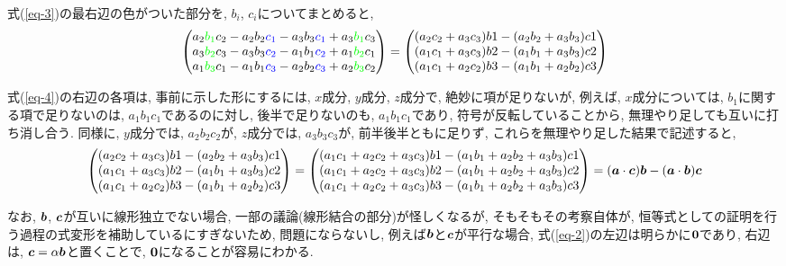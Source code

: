 \documentclass{jsarticle}
\newcommand*{\mbold}[1]{\mbox{\boldmath $#1$}}
\begin{document}
式(\ref{eq-3})の最右辺の色がついた部分を, $b_i$, $c_i$についてまとめると, 
\begin{equation}\label{eq-4}
  \begin{pmatrix}
      a_2 \textcolor{green}{b_1} c_2 - a_2 b_2 \textcolor{blue}{c_1} - a_3 b_3 \textcolor{blue}{c_1} + a_3 \textcolor{green}{b_1} c_3 \\
      a_3 \textcolor{green}{b_2} c_3 - a_3 b_3 \textcolor{blue}{c_2} - a_1 b_1 \textcolor{blue}{c_2} + a_1 \textcolor{green}{b_2} c_1 \\
      a_1 \textcolor{green}{b_3} c_1 - a_1 b_1 \textcolor{blue}{c_3} - a_2 b_2 \textcolor{blue}{c_3} + a_2 \textcolor{green}{b_3} c_2
  \end{pmatrix}
  = \begin{pmatrix}
      (a_2 c_2 + a_3 c_3)b1 - (a_2 b_2 + a_3 b_3)c1 \\
      (a_1 c_1 + a_3 c_3)b2 - (a_1 b_1 + a_3 b_3)c2 \\
      (a_1 c_1 + a_2 c_2)b3 - (a_1 b_1 + a_2 b_2)c3 
    \end{pmatrix}
\end{equation}

式(\ref{eq-4})の右辺の各項は, 事前に示した形にするには, $x$成分, $y$成分, $z$成分で, 絶妙に項が足りないが, 例えば, $x$成分については, $b_1$に関する項で足りないのは, $a_1 b_1 c_1$であるのに対し, 後半で足りないのも, $a_1 b_1 c_1$であり, 符号が反転していることから, 無理やり足しても互いに打ち消し合う. 
同様に, $y$成分では, $a_2 b_2 c_2$が, $z$成分では, $a_3 b_3 c_3$が, 前半後半ともに足りず, これらを無理やり足した結果で記述すると, 
\begin{equation}\label{eq-5}
  \begin{pmatrix}
      (a_2 c_2 + a_3 c_3)b1 - (a_2 b_2 + a_3 b_3)c1 \\
      (a_1 c_1 + a_3 c_3)b2 - (a_1 b_1 + a_3 b_3)c2 \\
      (a_1 c_1 + a_2 c_2)b3 - (a_1 b_1 + a_2 b_2)c3 
  \end{pmatrix}
  = \begin{pmatrix}
      (a_1 c_1 + a_2 c_2 + a_3 c_3)b1 - (a_1 b_1 + a_2 b_2 + a_3 b_3)c1 \\
      (a_1 c_1 + a_2 c_2 + a_3 c_3)b2 - (a_1 b_1 + a_2 b_2 + a_3 b_3)c2 \\
      (a_1 c_1 + a_2 c_2 + a_3 c_3)b3 - (a_1 b_1 + a_2 b_2 + a_3 b_3)c3 
    \end{pmatrix}
  = (\mbold{a} \cdot \mbold{c})\mbold{b} - (\mbold{a} \cdot \mbold{b})\mbold{c}
\end{equation}

なお, $\mbold{b}$, $\mbold{c}$が互いに線形独立でない場合, 一部の議論(線形結合の部分)が怪しくなるが, 
そもそもその考察自体が, 恒等式としての証明を行う過程の式変形を補助しているにすぎないため, 問題にならないし, 
例えば$\mbold{b}$と$\mbold{c}$が平行な場合, 
式(\ref{eq-2})の左辺は明らかに$\mbold{0}$であり, 右辺は, $\mbold{c} = \alpha \mbold{b}$と置くことで, $\mbold{0}$になることが容易にわかる. 
\end{document}
